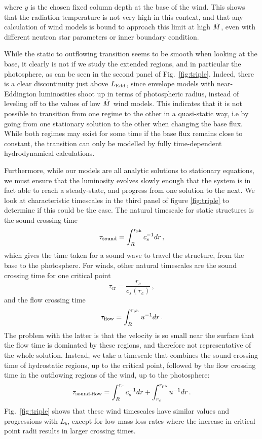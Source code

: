 \documentclass[../main.tex]{subfiles}
\begin{document}
\newpage

\noindent where $y$ is the chosen fixed column depth at the base of the wind. This shows that the radiation temperature is not very high in this context, and that any calculation of wind models is bound to approach this limit at high $\dot{M}$, even with different neutron star parameters or inner boundary condition. 

While the static to outflowing transition seems to be smooth when looking at the base, it clearly is not if we study the extended regions, and in particular the photosphere, as can be seen in the second panel of Fig.~\ref{fig:triple}. Indeed, there is a clear discontinuity just above $L_\text{Edd}$, since envelope models with near-Eddington luminosities shoot up in terms of photospheric radius, instead of leveling off to the values of low $\dot{M}$ wind models. This indicates that it is not possible to transition from one regime to the other in a quasi-static way, i.e by going from one stationary solution to the other when changing the base flux.  While both regimes may exist for some time if the base flux remains close to constant, the transition can only be modelled by fully time-dependent hydrodynamical calculations.  

Furthermore, while our models are all analytic solutions to stationary equations, we must ensure that the luminosity evolves slowly enough that the system is in fact able to reach a steady-state, and progress from one solution to the next.  We look at characteristic timescales in the third panel of figure \ref{fig:triple} to determine if this could be the case.  The natural timescale for static structures is the sound crossing time
\begin{equation}
    \tau_\text{sound}=\int_R^{r_\text{ph}}c_s^{-1}dr\,,
\end{equation}
which gives the time taken for a sound wave to travel the structure, from the base to the photosphere. For winds, other natural timescales are the sound crossing time for one critical point
\begin{equation}
    \tau_\text{cr}=\frac{r_c}{c_s(r_c)}\,,
\end{equation}
and the flow crossing time
\begin{equation}
    \tau_\text{flow}=\int_R^{r_\text{ph}}u^{-1}dr\, .
\end{equation}
The problem with the latter is that the velocity is so small near the surface that the flow time is dominated by these regions, and therefore not representative of the whole solution. Instead, we take a timescale that combines the sound crossing time of hydrostatic regions, up to the critical point, followed by the flow crossing time in the outflowing regions of the wind, up to the photosphere:
\begin{equation}
    \tau_\text{sound-flow}=\int_R^{r_c}c_s^{-1}dr + \int_{r_c}^{r_\text{ph}}u^{-1}dr \,.
\end{equation}
Fig.~\ref{fig:triple} shows that these wind timescales have similar values and progressions with $L_b$, except for low mass-loss rates where the increase in critical point radii results in larger crossing times. 
\end{document}

